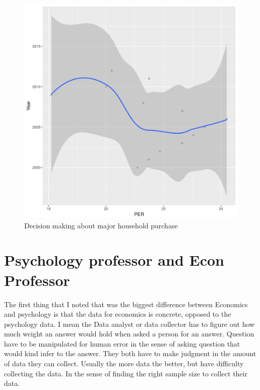 \documentclass[12pt]{article}
\begin{document}
\begin{figure}[h!]
\caption{Decision making about major household purchase  }
\centering
\includegraphics[scale=.5]{quest4Peru2.png}
\end{figure}
\clearpage


\section{Psychology professor  and Econ Professor}

The first thing that I noted that was the biggest difference between Economics and psychology is that the data for economics is concrete, opposed to the psychology data. I mean the Data analyst or data collector has to figure out how much weight an answer would hold when asked a person for an answer. Question have to be manipulated for human error in the sense of asking question that would kind infer to the answer. They both have to make judgment in the amount of data they can collect. Usually the more data the better, but have difficulty collecting the data. In the sense of finding the right sample size to collect their data.





\newpage


\end{document}
